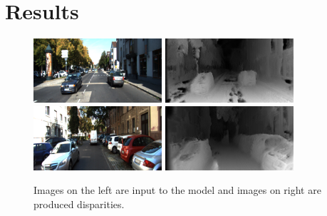 \documentclass{article}
\begin{document}
\section{Results}
\begin{figure}[h]
	\centering
	\includegraphics[width=180px]{imgs/8_left.png}
	\includegraphics[width=180px]{imgs/8_disp.png}\\
	\includegraphics[width=180px]{imgs/32_left.png}
	\includegraphics[width=180px]{imgs/32_disp.png}\\
	\caption{Images on the left are input to the model and images on right are produced disparities.}
\end{figure}





\end{document}
